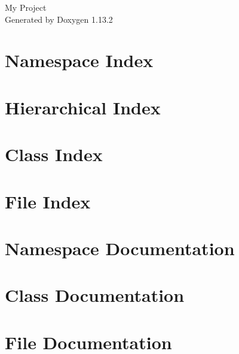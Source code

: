 \documentclass[twoside]{book}
\newcommand{\+}{\discretionary{\mbox{\scriptsize$\hookleftarrow$}}{}{}}
\newcommand{\clearemptydoublepage}{%
    \newpage{\pagestyle{empty}\cleardoublepage}%
  }
\begin{document}
  \raggedbottom
    \hypersetup{pageanchor=false,
                bookmarksnumbered=true,
                pdfencoding=unicode
               }
  \begin{titlepage}
  \vspace*{7cm}
  \begin{center}%
  {\Large My Project}\\
  \vspace*{1cm}
  {\large Generated by Doxygen 1.13.2}\\
  \end{center}
  \end{titlepage}
  \clearemptydoublepage
  \tableofcontents
  \clearemptydoublepage
  \hypersetup{pageanchor=true}
\chapter{Namespace Index}

\chapter{Hierarchical Index}

\chapter{Class Index}

\chapter{File Index}

\chapter{Namespace Documentation}

\chapter{Class Documentation}







\chapter{File Documentation}








  \backmatter
  \newpage
  \clearemptydoublepage
  \printindex
\end{document}
